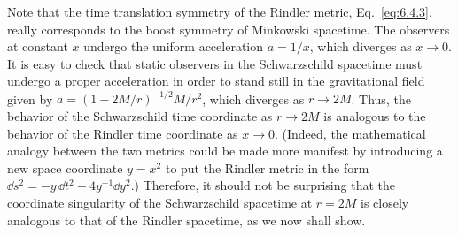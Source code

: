Note that the time translation symmetry of the Rindler metric,
Eq.~\eqref{eq:6.4.3}, really corresponds to the boost symmetry of Minkowski
spacetime. The observers at constant \(x\) undergo the uniform acceleration
\(a=1/x\), which diverges as \(x\to0\). It is easy to check that static observers
in the Schwarzschild spacetime must undergo a proper acceleration in order to
stand still in the gravitational field given by
\(a=(1-2M/r)^{-1/2}M/r^2\), which diverges as \(r\to2M\). Thus, the behavior of
the Schwarzschild time coordinate as \(r\to2M\) is analogous to the behavior of
the Rindler time coordinate as \(x\to0\). (Indeed, the mathematical analogy
between the two metrics could be made more manifest by introducing a new space
coordinate \(y=x^2\) to put the Rindler metric in the form
\(\dd s^2=-y\,\dd t^2+4y^{-1}\dd y^2\).) Therefore, it should not be surprising that the
coordinate singularity of the Schwarzschild spacetime at \(r=2M\) is closely
analogous to that of the Rindler spacetime, as we now shall show.

